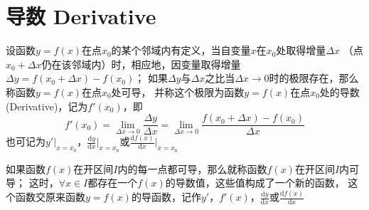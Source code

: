 \documentclass[UTF8]{ctexart}
\newcommand{\D}{\text{d}}
\begin{document}
\section*{导数 Derivative}

\bigskip

设函数$y=f(x)$在点$x_0$的某个邻域内有定义，当自变量$x$在$x_0$处取得增量$\Delta x$
（点$x_0+\Delta x$仍在该邻域内）时，相应地，因变量取得增量$\Delta y=f(x_0+\Delta x)-f(x_0)$；
如果$\Delta y$与$\Delta x$之比当$\Delta x\to0$时的极限存在，那么称函数$y=f(x)$在点$x_0$处可导，
并称这个极限为函数$y=f(x)$在点$x_0$处的导数 (Derivative)，记为$f'(x_0)$，即
\[ f'(x_0)=\lim_{\Delta x\to0}\frac{\Delta y}{\Delta x}=\lim_{\Delta x\to0}\frac{f(x_0+\Delta x)-f(x_0)}{\Delta x} \]
也可记为$y'|_{x=x_0}$，$\frac{\text{d}y}{\text{d}x}\big|_{x=x_0}$或$\frac{\text{d}f(x)}{\text{d}x}\big|_{x=x_0}$

\bigskip

如果函数$f(x)$在开区间$I$内的每一点都可导，那么就称函数$f(x)$在开区间$I$内可导；
这时，$\forall x\in I$都存在一个$f(x)$的导数值，这些值构成了一个新的函数，
这个函数交原来函数$y=f(x)$的导函数，记作$y'$，$f'(x)$，$\frac{\D y}{\D x}$或$\frac{\D f(x)}{\D x}$
\end{document}
